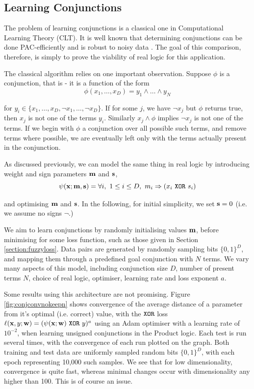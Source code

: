 \subsection{Learning Conjunctions}

The problem of learning conjunctions is a classical one in Computational Learning Theory (CLT). It is well known that determining conjunctions can be done PAC-efficiently \cite{clt} and is robust to noisy data \cite{noisyclt}. The goal of this comparison, therefore, is simply to prove the viability of real logic for this application.

The classical algorithm relies on one important observation. Suppose $\phi$ is a conjunction, that is - it is a function of the form 
$$\phi(x_1, \dots, x_D) = y_1 \land \dots \land y_N$$

for $y_i \in \{x_1, \dots, x_D, \lnot x_1, \dots, \lnot x_D\}$. If for some $j$, we have $\lnot x_j$ but $\phi$ returns true, then $x_j$ is not one of the terms $y_i$. Similarly $x_j \land \phi$ implies $\lnot x_j$ is not one of the terms. If we begin with $\phi$ a conjunction over all possible such terms, and remove terms where possible, we are eventually left only with the terms actually present in the conjunction.

As discussed previously, we can model the same thing in real logic by introducing weight and sign parameters $\mathbf{m}$ and $\mathbf{s}$, 
$$\psi(\mathbf{x}; \mathbf{m}, \mathbf{s}) = \forall i,\ 1 \leq i \leq D,\ m_i \Rightarrow (x_i \ \texttt{XOR}\  s_i)$$

and optimising $\mathbf{m}$ and $\mathbf{s}$. In the following, for initial simplicity, we set $\mathbf{s} = 0$ (i.e. we assume no signs $\lnot$.) 

We aim to learn conjunctions by randomly initialising values $\mathbf{m}$, before minimising for some loss function, such as those given in Section \ref{section:fuzzyloss}. Data pairs are generated by randomly sampling bits $\{0,1\}^D$, and mapping them through a predefined goal conjunction with $N$ terms. We vary many aspects of this model, including conjunction size $D$, number of present terms $N$, choice of real logic, optimiser, learning rate and loss exponent $a$.

Some results using this architecture are not promising. Figure \ref{fig:conjconvnokeepn} shows convergence of the average distance of a parameter from it's optimal (i.e. correct) value, with the $\texttt{XOR}$ loss $\ell(\mathbf{x}, y; \mathbf{w}) = (\psi(\mathbf{x};\mathbf{w}) \ \texttt{XOR}\  y)^a$ using an Adam optimiser with a learning rate of $10^{-2}$, when learning unsigned conjunctions in the Product logic. Each test is run several times, with the convergence of each run plotted on the graph. Both training and test data are uniformly sampled random bits $\{0,1\}^D$, with each epoch representing 10,000 such samples. We see that for low dimensionality, convergence is quite fast, whereas minimal changes occur with dimensionality any higher than 100. This is of course an issue.

